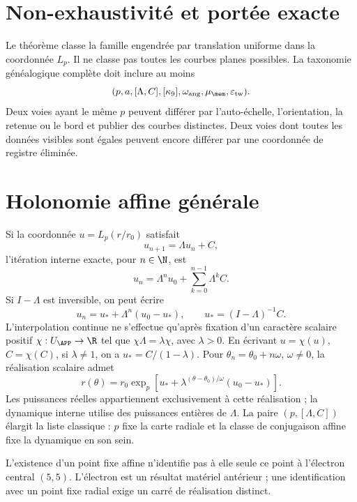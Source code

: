 \section{Non-exhaustivité et portée exacte}

Le théorème classe la famille engendrée par translation uniforme dans la coordonnée \(L_p\). Il ne classe pas toutes les courbes planes possibles. La taxonomie généalogique complète doit inclure au moins
\[
 (p,a,[\Lambda,C],[\kappa_9],
 \omega_{\mathrm{ang}},\mu_{\mem},\varepsilon_{\mathrm{tw}}).
\]
Deux voies ayant le même \(p\) peuvent différer par l'auto-échelle, l'orientation, la retenue ou le bord et publier des courbes distinctes. Deux voies dont toutes les données visibles sont égales peuvent encore différer par une coordonnée de registre éliminée.

\section{Holonomie affine générale}

Si la coordonnée \(u=L_p(r/r_0)\) satisfait
\[
 u_{n+1}=\Lambda u_n+C,
\]
l'itération interne exacte, pour \(n\in\N\), est
\[
 u_n=\Lambda^n u_0+\sum_{k=0}^{n-1}\Lambda^kC.
\]
Si \(I-\Lambda\) est inversible, on peut écrire
\[
 u_n=u_*+\Lambda^n(u_0-u_*),
 \qquad u_*=(I-\Lambda)^{-1}C.
\]
L'interpolation continue ne s'effectue qu'après fixation d'un caractère scalaire positif \(\chi:U_{\APP}\to\R\) tel que \(\chi\Lambda=\lambda\chi\), avec \(\lambda>0\). En écrivant \(u=\chi(u)\), \(C=\chi(C)\), si \(\lambda\neq1\), on a \(u_*=C/(1-\lambda)\). Pour \(\theta_n=\theta_0+n\omega\), \(\omega\neq0\), la réalisation scalaire admet
\begin{equation}
 r(\theta)=r_0\exp_p\!\left[
 u_*+\lambda^{(\theta-\theta_0)/\omega}(u_0-u_*)
 \right].
 \label{espiral:eq:familia-afin-general}
\end{equation}
Les puissances réelles appartiennent exclusivement à cette réalisation ; la dynamique interne utilise des puissances entières de \(\Lambda\). La paire \((p,[\Lambda,C])\) élargit la liste classique : \(p\) fixe la carte radiale et la classe de conjugaison affine fixe la dynamique en son sein.

\begin{remark}
L'existence d'un point fixe affine n'identifie pas à elle seule ce point à l'électron central \((5,5)\). L'électron est un résultat matériel antérieur ; une identification avec un point fixe radial exige un carré de réalisation distinct.
\end{remark}

